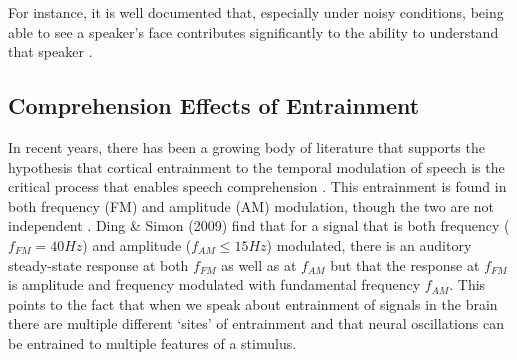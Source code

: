 \documentclass[titlepage]{article}
\begin{document}
    For instance, it is well documented that, especially under noisy
    conditions, being able to see a speaker's face contributes significantly to
    the ability to understand that speaker \cite{Sumby1954,Erber1969}.

  \subsection{Comprehension Effects of Entrainment}

    In recent years, there has been a growing body of literature that supports
    the hypothesis that cortical entrainment to the temporal modulation of
    speech is the critical process that enables speech comprehension
    \cite{Meyer2018,Morillon2015,ZionGolumbic2013,Doelling2014}. This
    entrainment is found in both frequency (FM) and amplitude (AM) modulation,
    though the two are not independent \cite{Ding2009}. Ding \& Simon (2009)
    \cite{Ding2009} find that for a signal that is both frequency
    ($f_{FM}=40Hz$) and amplitude ($f_{AM}\leq 15Hz$) modulated, there is an
    auditory steady-state response at both $f_{FM}$ as well as at $f_{AM}$ but
    that the response at $f_{FM}$ is amplitude and frequency modulated with
    fundamental frequency $f_{AM}$. This points to the fact that when we speak
    about entrainment of signals in the brain there are multiple different
    `sites' of entrainment and that neural oscillations can be entrained to
    multiple features of a stimulus.


\newpage
\printbibliography
\end{document}
